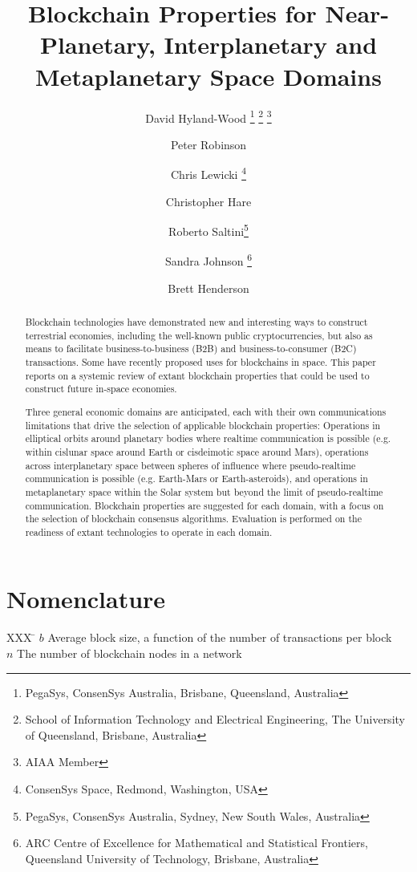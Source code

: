 \documentclass[]{aiaa-tc}%
\title{Blockchain Properties for Near-Planetary, Interplanetary and Metaplanetary Space Domains}
\author{
  David Hyland-Wood%
    \thanks{PegaSys, ConsenSys Australia, Brisbane, Queensland, Australia}
    \thanks{School of Information Technology and Electrical Engineering, The University of Queensland, Brisbane, Australia}
    \thanks{AIAA Member}\\
  \and Peter Robinson\thanksibid{1} \thanksibid{2}
  \and Chris Lewicki%
   \thanks{ConsenSys Space, Redmond, Washington, USA}
   \thanksibid{3}
  \and Christopher Hare\thanksibid{1}
  \and Roberto Saltini\thanks{PegaSys, ConsenSys Australia, Sydney, New South Wales, Australia}
  \and Sandra Johnson\thanksibid{1}
  	\thanks{ARC Centre of Excellence for Mathematical and Statistical Frontiers, Queensland University of Technology, Brisbane, Australia}
  \and Brett Henderson\thanksibid{1}
 }
\begin{document}
\maketitle

\begin{abstract}
Blockchain technologies have demonstrated new and interesting ways to construct terrestrial economies, including the well-known public cryptocurrencies, but also as means to facilitate business-to-business (B2B) and business-to-consumer (B2C) transactions. Some have recently proposed uses for blockchains in space. This paper reports on a systemic review of extant blockchain properties that could be used to construct future in-space economies.

Three general economic domains are anticipated, each with their own communications limitations that drive the selection of applicable blockchain properties: Operations in elliptical orbits around planetary bodies where realtime communication is possible (e.g. within cislunar space around Earth or cisdeimotic space around Mars), operations across interplanetary space between spheres of influence where pseudo-realtime communication is possible (e.g. Earth-Mars or Earth-asteroids), and operations in metaplanetary space within the Solar system but beyond the limit of pseudo-realtime communication. Blockchain properties are suggested for each domain, with a focus on the selection of blockchain consensus algorithms. Evaluation is performed on the readiness of extant technologies to operate in each domain.
\end{abstract}

\section*{Nomenclature}
\begin{tabbing}
  XXX \= \kill%
  $b$ \> Average block size, a function of the number of transactions per block \\
  $n$ \> The number of blockchain nodes in a network \\
 \end{tabbing}
\end{document}
